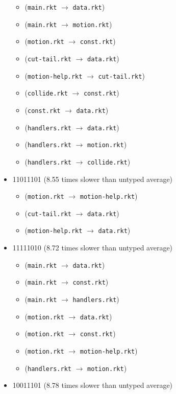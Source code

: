 \documentclass{article}
\newcommand{\mono}[1]{\texttt{#1}}
\begin{document}
\begin{itemize}
\begin{itemize}
  \item (\mono{main.rkt} $\rightarrow$ \mono{data.rkt})
  \item (\mono{main.rkt} $\rightarrow$ \mono{motion.rkt})
  \item (\mono{motion.rkt} $\rightarrow$ \mono{const.rkt})
  \item (\mono{cut-tail.rkt} $\rightarrow$ \mono{data.rkt})
  \item (\mono{motion-help.rkt} $\rightarrow$ \mono{cut-tail.rkt})
  \item (\mono{collide.rkt} $\rightarrow$ \mono{const.rkt})
  \item (\mono{const.rkt} $\rightarrow$ \mono{data.rkt})
  \item (\mono{handlers.rkt} $\rightarrow$ \mono{data.rkt})
  \item (\mono{handlers.rkt} $\rightarrow$ \mono{motion.rkt})
  \item (\mono{handlers.rkt} $\rightarrow$ \mono{collide.rkt})
  \end{itemize}
\item 11011101 (8.55 times slower than untyped average)
  \begin{itemize}
  \item (\mono{motion.rkt} $\rightarrow$ \mono{motion-help.rkt})
  \item (\mono{cut-tail.rkt} $\rightarrow$ \mono{data.rkt})
  \item (\mono{motion-help.rkt} $\rightarrow$ \mono{data.rkt})
  \end{itemize}
\item 11111010 (8.72 times slower than untyped average)
  \begin{itemize}
  \item (\mono{main.rkt} $\rightarrow$ \mono{data.rkt})
  \item (\mono{main.rkt} $\rightarrow$ \mono{const.rkt})
  \item (\mono{main.rkt} $\rightarrow$ \mono{handlers.rkt})
  \item (\mono{motion.rkt} $\rightarrow$ \mono{data.rkt})
  \item (\mono{motion.rkt} $\rightarrow$ \mono{const.rkt})
  \item (\mono{motion.rkt} $\rightarrow$ \mono{motion-help.rkt})
  \item (\mono{handlers.rkt} $\rightarrow$ \mono{motion.rkt})
  \end{itemize}
\item 10011101 (8.78 times slower than untyped average)
  \begin{itemize}

\end{itemize}
\end{itemize}
\end{document}
